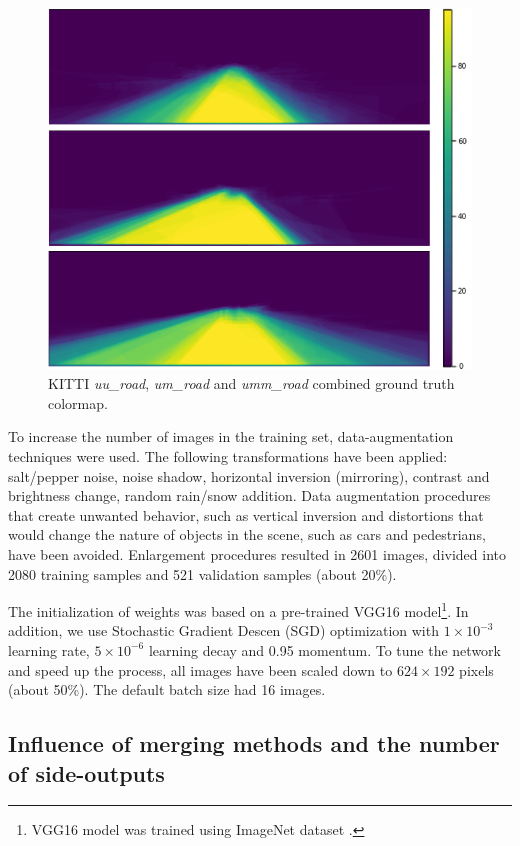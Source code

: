 \begin{figure}%
  \centering
  \includegraphics[width=0.9\columnwidth]{../imagens/visualiz_dados/kitti_colormap.png}
  \caption{KITTI \textit{uu\_road}, \textit{um\_road} and \textit{umm\_road} combined ground truth colormap.}
  \label{fig:kitti_colormap}
\end{figure}

To increase the number of images in the training set, data-augmentation techniques were used.
The following transformations have been applied: salt/pepper noise, noise shadow, horizontal inversion (mirroring), contrast and brightness change, random rain/snow addition.
Data augmentation procedures that create unwanted behavior, such as vertical inversion and distortions that would change the nature of objects in the scene, such as cars and pedestrians, have been avoided.
Enlargement procedures resulted in 2601 images, divided into 2080 training samples and 521 validation samples (about 20\%).

The initialization of weights was based on a pre-trained VGG16 model\footnote{VGG16 model was trained using ImageNet dataset \cite{ILSVRC15}.}.
In addition, we use Stochastic Gradient Descen (SGD) optimization with $1 \times 10^{-3}$ learning rate, $5 \times 10^{-6}$ learning decay and 0.95 momentum.
To tune the network and speed up the process, all images have been scaled down to $624 \times 192$ pixels (about 50\%). 
The default batch size had 16 images.

\subsection{Influence of merging methods and the number of side-outputs}
\label{cap6_experm_1_qtd_saidas}

